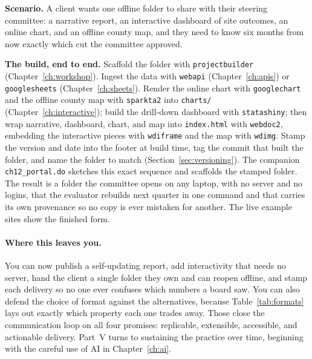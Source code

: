 \documentclass[
    a4paper,
    fontsize=10pt,
    twoside=true,
    numbers=noenddot,
]{kaobook}
\newcounter{appliedexample}
\newenvironment{appliedexample}[1][]{%
    \refstepcounter{appliedexample}%
    \begin{appliedexamplebox}[frametitle={Applied Example~\theappliedexample.~~#1}]%
}{%
    \end{appliedexamplebox}%
}
\begin{document}
\begin{appliedexample}[One evaluation, one folder]
\textbf{Scenario.} A client wants one offline folder to share with their steering committee: a narrative report, an interactive dashboard of site outcomes, an online chart, and an offline county map, and they need to know six months from now exactly which cut the committee approved.

\medskip
\textbf{The build, end to end.} Scaffold the folder with \texttt{projectbuilder} (Chapter~\ref{ch:workshop}). Ingest the data with \texttt{webapi} (Chapter~\ref{ch:apis}) or \texttt{googlesheets} (Chapter~\ref{ch:sheets}). Render the online chart with \texttt{googlechart} and the offline county map with \texttt{sparkta2} into \texttt{charts/} (Chapter~\ref{ch:interactive}); build the drill-down dashboard with \texttt{statashiny}; then wrap narrative, dashboard, chart, and map into \texttt{index.html} with \texttt{webdoc2}, embedding the interactive pieces with \texttt{wdiframe} and the map with \texttt{wdimg}. Stamp the version and date into the footer at build time, tag the commit that built the folder, and name the folder to match (Section~\ref{sec:versioning}). The companion \texttt{ch12\_portal.do} sketches this exact sequence and scaffolds the stamped folder. The result is a folder the committee opens on any laptop, with no server and no logins, that the evaluator rebuilds next quarter in one command and that carries its own provenance so no copy is ever mistaken for another. The live example sites show the finished form.
\end{appliedexample}

\paragraph{Where this leaves you.} You can now publish a self-updating report, add interactivity that needs no server, hand the client a single folder they own and can reopen offline, and stamp each delivery so no one ever confuses which numbers a board saw. You can also defend the choice of format against the alternatives, because Table~\ref{tab:formats} lays out exactly which property each one trades away. Those close the communication loop on all four promises: replicable, extensible, accessible, and actionable delivery. Part~V turns to sustaining the practice over time, beginning with the careful use of AI in Chapter~\ref{ch:ai}.

\end{document}
